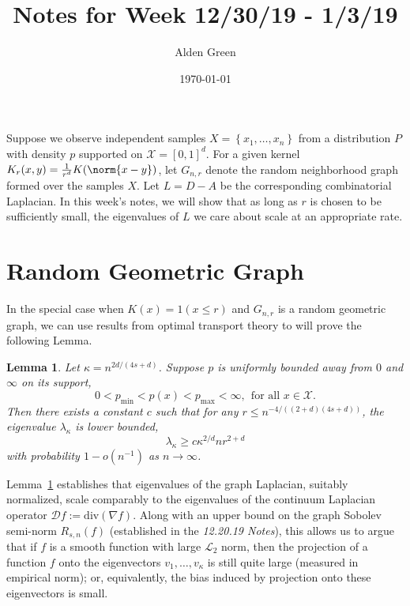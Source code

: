 \documentclass{article}
\newcommand{\set}[1]{\left\{#1\right\}}
\newcommand{\1}{\mathbf{1}}
\newcommand{\Xset}{\mathcal{X}}
\theoremstyle{alden}
\theoremstyle{aldenthm}
\newtheorem{lemma}{Lemma}
\theoremstyle{definition}
\theoremstyle{remark}
\begin{document}
\title{Notes for Week 12/30/19 - 1/3/19}
\author{Alden Green}
\date{\today}
\maketitle

Suppose we observe independent samples $X = \set{x_1,\ldots,x_n}$ from a distribution $P$ with density $p$ supported on $\mathcal{X} = [0,1]^d$. For a given kernel $K_r(x,y) = \frac{1}{r^d}K(\norm{x - y})$, let $G_{n,r}$ denote the random neighborhood graph formed over the samples $X$. Let $L = D - A$ be the corresponding combinatorial Laplacian. In this week's notes, we will show that as long as $r$ is chosen to be sufficiently small, the eigenvalues of $L$ we care about scale at an appropriate rate.

\section{Random Geometric Graph}
In the special case when $K(x) = 1(x \leq r)$ and $G_{n,r}$ is a random geometric graph, we can use results from optimal transport theory to  will prove the following Lemma.
\begin{lemma}
	\label{lem:higher_order_eigenvalue_tail_bound}
	Let $\kappa = n^{2d/(4s + d)}$. Suppose $p$ is uniformly bounded away from $0$ and $\infty$ on its support,
	\begin{equation*}
	0 < p_{\min} < p(x) < p_{\max} < \infty,~~\textrm{for all $x \in \Xset$.}
	\end{equation*}
	Then there exists a constant $c$ such that for any $r \leq n^{-4/((2+d)(4s + d))}$, the eigenvalue $\lambda_{\kappa}$ is lower bounded,
	\begin{equation}
	\label{eqn:higher_order_eigenvalue_tail_bound}
	\lambda_{\kappa} \geq c\kappa^{2/d}nr^{2 + d}
	\end{equation}
	with probability $1 - o(n^{-1})$ as $n \to \infty$.
\end{lemma}
Lemma~\ref{lem:higher_order_eigenvalue_tail_bound} establishes that eigenvalues of the graph Laplacian, suitably normalized, scale comparably to the eigenvalues of the continuum Laplacian operator $\mathcal{D}f := \textrm{div}(\nabla f)$. Along with an upper bound on the graph Sobolev semi-norm $R_{s,n}(f)$ (established in the \textit{12.20.19 Notes}), this allows us to argue that if $f$ is a smooth function with large $\mathcal{L}_2$ norm, then the projection of a function $f$ onto the eigenvectors $v_1,\ldots,v_{\kappa}$ is still quite large (measured in empirical norm); or, equivalently, the bias induced by projection onto these eigenvectors is small.
\end{document}
